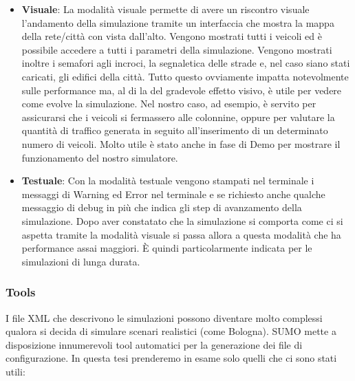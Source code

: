 \begin{itemize}
	\item \textbf{Visuale}: La modalità visuale permette di avere un riscontro visuale l'andamento della simulazione tramite un interfaccia che mostra la mappa della rete/città con vista dall'alto. Vengono mostrati tutti i veicoli ed è possibile accedere a tutti i parametri della simulazione. Vengono mostrati inoltre i semafori agli incroci, la segnaletica delle strade e, nel caso siano stati caricati, gli edifici della città. Tutto questo ovviamente impatta notevolmente sulle performance ma, al di la del gradevole effetto visivo, è utile per vedere come evolve la simulazione. Nel nostro caso, ad esempio, è servito per assicurarsi che i veicoli si fermassero alle colonnine, oppure per valutare la quantità di traffico generata in seguito all'inserimento di un determinato numero di veicoli. Molto utile è stato anche in fase di Demo per mostrare il funzionamento del nostro simulatore.
	\item \textbf{Testuale}: Con la modalità testuale vengono stampati nel terminale i messaggi di Warning ed Error nel terminale e se richiesto anche qualche messaggio di debug in più che indica gli step di avanzamento della simulazione. Dopo aver constatato che la simulazione si comporta come ci si aspetta tramite la modalità visuale si passa allora a questa modalità che ha performance assai maggiori. È quindi particolarmente indicata per le simulazioni di lunga durata.
\end{itemize}

\subsubsection{Tools}\label{sumo-tools}

I file XML che descrivono le simulazioni possono diventare molto complessi qualora si decida di simulare scenari realistici (come Bologna). SUMO mette a disposizione innumerevoli tool automatici per la generazione dei file di configurazione.  In questa tesi prenderemo in esame solo quelli che ci sono stati utili:

